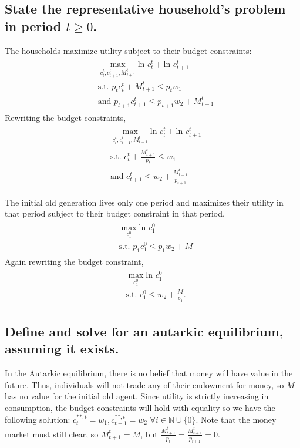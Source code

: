 \documentclass[11pt]{article} %
\begin{document}
\subsection{State the representative household's problem in period $t \geq 0$.}
The households maximize utility subject to their budget constraints:
\begin{align*}
\begin{split}
&\max_{c_{t}^{t},c_{t+1}^{t},M_{t+1}^t} \text{ln } c_{t}^{t} + \text{ln } c_{t+1}^{t}\\ 
&\text{s.t. } p_t c_{t}^{t} + M_{t+1}^{t} \leq p_t w_1 \\
&\text{and } p_{t+1} c_{t+1}^{t} \leq p_{t+1} w_2 + M_{t+1}^{t}
\end{split}
\end{align*}
Rewriting the budget constraints,
\begin{align}
\begin{split}
&\max_{c_{t}^{t},c_{t+1}^{t},M_{t+1}^t} \text{ln } c_{t}^{t} + \text{ln } c_{t+1}^{t}\\  \label{eqn:hh}
&\text{s.t. } c_{t}^{t} + \frac{M_{t+1}^{t}}{p_t} \leq w_1 \\
&\text{and }  c_{t+1}^{t} \leq w_2 + \frac{M_{t+1}^{t}}{p_{t+1}}
\end{split}
\end{align}


The initial old generation
 lives only one period and maximizes their utility in that period subject to their budget constraint in that period.
\begin{align*}
\begin{split}
&\max_{c_{1}^{0}} \text{ln } c_{1}^{0}\\ 
&\text{s.t. } p_{1} c_{1}^{0} \leq p_{1} w_2 + M
\end{split}
\end{align*}
Again rewriting the budget constraint,
\begin{align*}
\begin{split}
&\max_{c_{1}^{0}} \text{ln } c_{1}^{0}\\ 
&\text{s.t. } c_{1}^{0} \leq w_2 + \frac{M}{p_1}.
\end{split}
\end{align*}

\subsection{Define and solve for an autarkic equilibrium, assuming it exists.} %
In the Autarkic equilibrium, there is no belief that money will have value in the future. Thus, individuals will not trade any of their endowment for money, so  $M$ has no value for the initial old agent. Since utility is strictly increasing in consumption, the budget constraints will hold with equality so we have the following solution: $c_t^{**,t} = w_1, c_{t+1}^{**,t} = w_2$ $\forall i \in \mathbb{N} \cup \{0\}.$ Note that the money market must still clear, so $M_{t+1}^t = M$, but $\frac{M_{t+1}^t}{p_{t}} = \frac{M_{t+1}^t}{p_{t+1}} = 0.$
\end{document}
